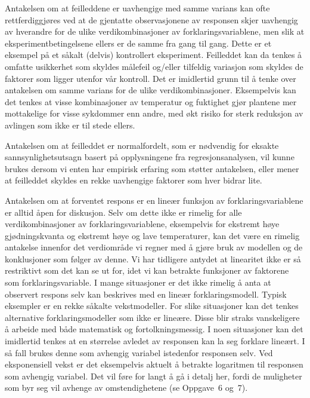 Antakelsen om at feilleddene er uavhengige med samme varians kan ofte
rettferdiggjøres ved at de gjentatte observasjonene av responsen skjer
uavhengig av hverandre for de ulike verdikombinasjoner av 
forkla\-rings\-varia\-blene, men slik at eksperimentbetingelsene ellers er de 
samme fra gang til gang.  Dette er et eksempel på et såkalt (delvis)
kontrollert eksperiment.  Feilleddet kan da tenkes å omfatte usikkerhet
som skyldes målefeil og/eller tilfeldig variasjon som skyldes de faktorer
som ligger utenfor vår kontroll.  Det er imidlertid grunn til å tenke
over antakelsen om samme varians for de ulike verdikombinasjoner.  
Eksempelvis kan det tenkes at visse kombinasjoner av temperatur og fuktighet
gjør plantene mer mottakelige for visse sykdommer enn andre, med økt
risiko for sterk reduksjon av avlingen som ikke er til stede ellers.

Antakelsen om at feilleddet er normalfordelt, som er nødvendig for eksakte
sannsynlighetsutsagn basert på opplysningene fra regresjonsanalysen, vil
kunne brukes dersom vi enten har empirisk erfaring som støtter antakelsen,
eller mener at feilleddet skyldes en rekke uavhengige faktorer som hver 
bidrar lite.

Antakelsen om at forventet respons er en lineær funksjon av 
forklaringsvariablene er alltid åpen for diskusjon.  Selv om dette ikke
er rimelig for alle verdikombinasjoner av forklaringsvariablene, eksempelvis
for ekstremt høye gjødningskvanta og ekstremt høye og lave 
temperaturer, kan det være en rimelig antakelse innenfor det 
verdiområde  vi regner med å gjøre  bruk av modellen og de 
konklusjoner som følger av denne.  Vi har tidligere antydet at
linearitet ikke er så restriktivt som det kan se ut for, idet vi kan
betrakte funksjoner av faktorene som forklaringsvariable.  I mange 
situasjoner er det ikke rimelig å anta at observert respons selv kan
beskrives med en lineær forklaringsmodell.  Typisk eksempler er en
rekke såkalte vekstmodeller.  For slike situasjoner kan det tenkes
alternative forklaringsmodeller som ikke er lineære.  Disse blir straks
vanskeligere å arbeide med både matematisk og fortolkningsmessig.
I noen situasjoner kan det imidlertid tenkes at en størrelse avledet av
responsen kan la seg forklare lineært.  I så fall brukes denne som
avhengig variabel istedenfor responsen selv.  Ved eksponensiell vekst er det
eksempelvis aktuelt å betrakte logaritmen til responsen som avhengig
variabel.  Det vil føre for langt å gå i detalj her, fordi de
muligheter som byr seg vil avhenge av omstendighetene (se Oppgave~6 og~7).

